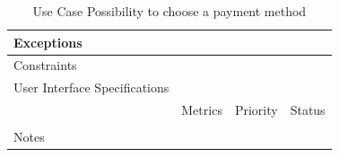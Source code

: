 \begin{table}[H]
\begin{tabularx}{\linewidth}{|l|X|X|X|}
            \hline Exceptions                    & \multicolumn{3}{l|}{}                                                                                 \\

            \hline Constraints                   & \multicolumn{3}{l|}{}                                                                                 \\

            \hline User Interface Specifications & \multicolumn{3}{l|}{}                                                                                 \\

            \hline \multirow{2}{*}{}             & Metrics                                                                           & Priority & Status \\
            \cline{2-4}                          &                                                                                   &          &        \\
            \hline Notes                         & \multicolumn{3}{l|}{}                                                                                 \\
            \hline
      \end{tabularx}
      \caption{Use Case Possibility to choose a payment method}
      \label{tab:use_case_Possibility to choose a payment method}
\end{table}

